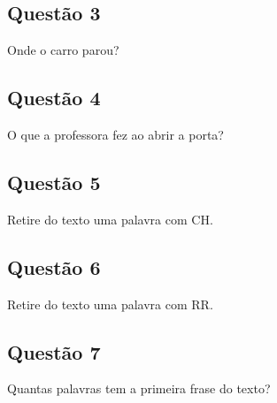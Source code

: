 \begin{center}
  \underline{\hspace{12cm}}
\end{center}

\subsection*{Questão 3}
Onde o carro parou?

\begin{center}
  \underline{\hspace{12cm}}
\end{center}

\subsection*{Questão 4}
O que a professora fez ao abrir a porta?

\begin{center}
  \underline{\hspace{12cm}}
\end{center}

\subsection*{Questão 5}
Retire do texto uma palavra com CH.

\begin{center}
  \underline{\hspace{12cm}}
\end{center}

\subsection*{Questão 6}
Retire do texto uma palavra com RR.

\begin{center}
  \underline{\hspace{12cm}}
\end{center}

\subsection*{Questão 7}
Quantas palavras tem a primeira frase do texto?

\begin{center}
  \underline{\hspace{12cm}}
\end{center}

